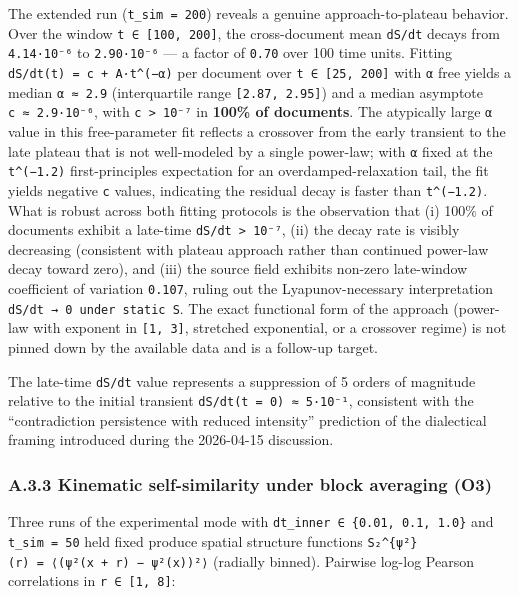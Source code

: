 \documentclass[
]{article}
\begin{document}
The extended run (\texttt{t\_sim\ =\ 200}) reveals a genuine
approach-to-plateau behavior. Over the window
\texttt{t\ ∈\ {[}100,\ 200{]}}, the cross-document mean \texttt{dS/dt}
decays from \texttt{4.14·10⁻⁶} to \texttt{2.90·10⁻⁶} --- a factor of
\texttt{0.70} over 100 time units. Fitting
\texttt{dS/dt(t)\ =\ c\ +\ A·t\^{}(−α)} per document over
\texttt{t\ ∈\ {[}25,\ 200{]}} with \texttt{α} free yields a median
\texttt{α\ ≈\ 2.9} (interquartile range \texttt{{[}2.87,\ 2.95{]}}) and
a median asymptote \texttt{c\ ≈\ 2.9·10⁻⁶}, with
\texttt{c\ \textgreater{}\ 10⁻⁷} in \textbf{100\% of documents}. The
atypically large \texttt{α} value in this free-parameter fit reflects a
crossover from the early transient to the late plateau that is not
well-modeled by a single power-law; with \texttt{α} fixed at the
\texttt{t\^{}(−1.2)} first-principles expectation for an
overdamped-relaxation tail, the fit yields negative \texttt{c} values,
indicating the residual decay is faster than \texttt{t\^{}(−1.2)}. What
is robust across both fitting protocols is the observation that (i)
100\% of documents exhibit a late-time
\texttt{dS/dt\ \textgreater{}\ 10⁻⁷}, (ii) the decay rate is visibly
decreasing (consistent with plateau approach rather than continued
power-law decay toward zero), and (iii) the source field exhibits
non-zero late-window coefficient of variation \texttt{0.107}, ruling out
the Lyapunov-necessary interpretation
\texttt{dS/dt\ →\ 0\ under\ static\ S}. The exact functional form of the
approach (power-law with exponent in \texttt{{[}1,\ 3{]}}, stretched
exponential, or a crossover regime) is not pinned down by the available
data and is a follow-up target.

The late-time \texttt{dS/dt} value represents a suppression of 5 orders
of magnitude relative to the initial transient
\texttt{dS/dt(t\ =\ 0)\ ≈\ 5·10⁻¹}, consistent with the ``contradiction
persistence with reduced intensity'' prediction of the dialectical
framing introduced during the 2026-04-15 discussion.

\hypertarget{a.3.3-kinematic-self-similarity-under-block-averaging-o3}{%
\subsubsection{A.3.3 Kinematic self-similarity under block averaging
(O3)}\label{a.3.3-kinematic-self-similarity-under-block-averaging-o3}}

Three runs of the experimental mode with
\texttt{dt\_inner\ ∈\ \{0.01,\ 0.1,\ 1.0\}} and \texttt{t\_sim\ =\ 50}
held fixed produce spatial structure functions
\texttt{S₂\^{}\{\textbar{}ψ\textbar{}²\}(r)\ =\ ⟨(\textbar{}ψ\textbar{}²(x\ +\ r)\ −\ \textbar{}ψ\textbar{}²(x))²⟩}
(radially binned). Pairwise log-log Pearson correlations in
\texttt{r\ ∈\ {[}1,\ 8{]}}:
\end{document}
